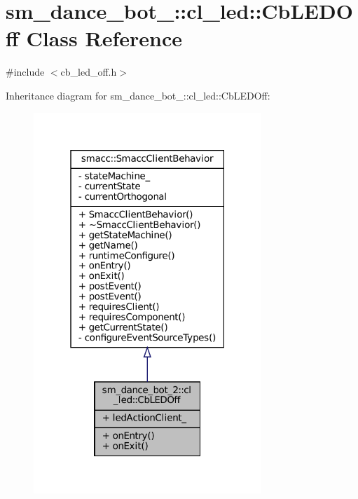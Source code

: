 \hypertarget{classsm__dance__bot__2_1_1cl__led_1_1CbLEDOff}{}\section{sm\+\_\+dance\+\_\+bot\+\_\+:\+:cl\+\_\+led\+:\+:Cb\+L\+E\+D\+Off Class Reference}
\label{classsm__dance__bot__2_1_1cl__led_1_1CbLEDOff}


{\ttfamily \#include $<$cb\+\_\+led\+\_\+off.\+h$>$}



Inheritance diagram for sm\+\_\+dance\+\_\+bot\+\_\+:\+:cl\+\_\+led\+:\+:Cb\+L\+E\+D\+Off\+:
\nopagebreak
\begin{figure}[H]
\begin{center}
\leavevmode
\includegraphics[width=244pt]{classsm__dance__bot__2_1_1cl__led_1_1CbLEDOff__inherit__graph}
\end{center}
\end{figure}


